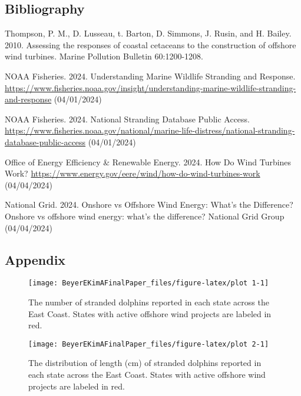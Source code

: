 \documentclass[
]{article}
\begin{document}
\hypertarget{bibliography}{%
\subsection{Bibliography}\label{bibliography}}

Thompson, P. M., D. Lusseau, t. Barton, D. Simmons, J. Rusin, and H.
Bailey. 2010. Assessing the responses of coastal cetaceans to the
construction of offshore wind turbines. Marine Pollution Bulletin
60:1200-1208.

NOAA Fisheries. 2024. Understanding Marine Wildlife Stranding and
Response.
\url{https://www.fisheries.noaa.gov/insight/understanding-marine-wildlife-stranding-and-response}
(04/01/2024)

NOAA Fisheries. 2024. National Stranding Database Public Access.
\url{https://www.fisheries.noaa.gov/national/marine-life-distress/national-stranding-database-public-access}
(04/01/2024)

Office of Energy Efficiency \& Renewable Energy. 2024. How Do Wind
Turbines Work?
\url{https://www.energy.gov/eere/wind/how-do-wind-turbines-work}
(04/04/2024)

National Grid. 2024. Onshore vs Offshore Wind Energy: What's the
Difference? Onshore vs offshore wind energy: what's the difference?
\textbar{} National Grid Group (04/04/2024)

\hypertarget{appendix}{%
\subsection{Appendix}\label{appendix}}

\begin{figure}

{\centering \texttt{[image: BeyerEKimAFinalPaper\_files/figure-latex/plot 1-1]} 

}

\caption{\label{fig:figs} The number of stranded dolphins reported in each state across the East Coast. States with active offshore wind projects are labeled in red.}\label{fig:plot 1}
\end{figure}

\begin{figure}

{\centering \texttt{[image: BeyerEKimAFinalPaper\_files/figure-latex/plot 2-1]} 

}

\caption{\label{fig:figs} The distribution of length (cm) of stranded dolphins reported in each state across the East Coast. States with active offshore wind projects are labeled in red.}\label{fig:plot 2}
\end{figure}
\end{document}
